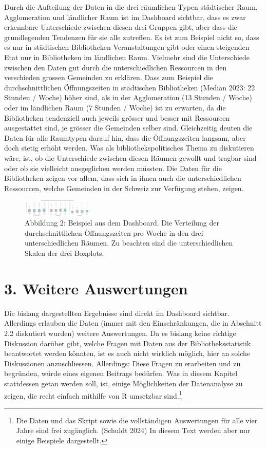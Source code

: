 \documentclass[a4paper,
fontsize=11pt,
oneside,
numbers=noperiodatend,
parskip=half-,
bibliography=totoc,
final
]{scrartcl}
\begin{document}
Durch die Aufteilung der Daten in die drei räumlichen Typen städtischer
Raum, Agglomeration und ländlicher Raum ist im Dashboard sichtbar, dass
es zwar erkennbare Unterschiede zwischen diesen drei Gruppen gibt, aber
dass die grundlegenden Tendenzen für sie alle zutreffen. Es ist zum
Beispiel nicht so, dass es nur in städtischen Bibliotheken
Veranstaltungen gibt oder einen steigenden Etat nur in Bibliotheken im
ländlichen Raum. Vielmehr sind die Unterschiede zwischen den Daten gut
durch die unterschiedlichen Ressourcen in den verschieden grossen
Gemeinden zu erklären. Dass zum Beispiel die durchschnittlichen
Öffnungszeiten in städtischen Bibliotheken (Median 2023: 22 Stunden /
Woche) höher sind, als in der Agglomeration (13 Stunden / Woche) oder im
ländlichen Raum (7 Stunden / Woche) ist zu erwarten, da die Bibliotheken
tendenziell auch jeweils grösser und besser mit Ressourcen ausgestattet
sind, je grösser die Gemeinden selber sind. Gleichzeitig deuten die
Daten für alle Raumtypen darauf hin, dass die Öffnungszeiten langsam,
aber doch stetig erhöht werden. Was als bibliothekspolitisches Thema zu
diskutieren wäre, ist, ob die Unterschiede zwischen diesen Räumen
gewollt und tragbar sind -- oder ob sie vielleicht ausgeglichen werden
müssten. Die Daten für die Bibliotheken zeigen vor allem, dass sich in
ihnen auch die unterschiedlichen Ressourcen, welche Gemeinden in der
Schweiz zur Verfügung stehen, zeigen.

\begin{figure}
\centering
\includegraphics[angle=90,width=0.3\textwidth]{img/Abbildung02.PNG}
\caption{Abbildung 2: Beispiel aus dem Dashboard. Die Verteilung der
durchschnittlichen Öffnungszeiten pro Woche in den drei
unterschiedlichen Räumen. Zu beachten sind die unterschiedlichen Skalen
der drei Boxplots.}
\end{figure}

\section{3. Weitere Auswertungen}\label{weitere-auswertungen}

Die bislang dargestellten Ergebnisse sind direkt im Dashboard sichtbar.
Allerdings erlauben die Daten (immer mit den Einschränkungen, die in
Abschnitt 2.2 diskutiert wurden) weitere Auswertungen. Da es bislang
keine richtige Diskussion darüber gibt, welche Fragen mit Daten aus der
Bibliotheksstatistik beantwortet werden könnten, ist es auch nicht
wirklich möglich, hier an solche Diskussionen anzuschliessen.
Allerdings: Diese Fragen zu erarbeiten und zu begründen, würde eines
eigenen Beitrags bedürfen. Was in diesem Kapitel stattdessen getan
werden soll, ist, einige Möglichkeiten der Datenanalyse zu zeigen, die
recht einfach mithilfe von R umsetzbar sind.\footnote{Die Daten und das
  Skript sowie die vollständigen Auswertungen für alle vier Jahre sind
  frei zugänglich. (Schuldt 2024) In diesem Text werden aber nur einige
  Beispiele dargestellt.}
\end{document}
